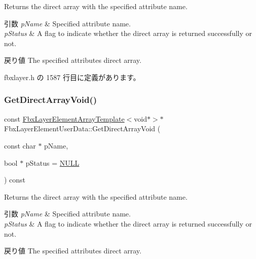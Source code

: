 Returns the direct array with the specified attribute name. 
\begin{DoxyParams}{引数}
{\em p\+Name} & Specified attribute name. \\
\hline
{\em p\+Status} & A flag to indicate whether the direct array is returned successfully or not. \\
\hline
\end{DoxyParams}
\begin{DoxyReturn}{戻り値}
The specified attribute\textquotesingle{}s direct array. 
\end{DoxyReturn}


 fbxlayer.\+h の 1587 行目に定義があります。

\mbox{\label{class_fbx_layer_element_user_data_a3dc62d940655a5afbf1e8893dba620a3}} 
\subsubsection{\texorpdfstring{Get\+Direct\+Array\+Void()}{GetDirectArrayVoid()}\hspace{0.1cm}{\footnotesize\ttfamily [4/4]}}
{\footnotesize\ttfamily const \hyperlink{class_fbx_layer_element_array_template}{Fbx\+Layer\+Element\+Array\+Template}$<$void$\ast$$>$$\ast$ Fbx\+Layer\+Element\+User\+Data\+::\+Get\+Direct\+Array\+Void (\begin{DoxyParamCaption}\item[{const char $\ast$}]{p\+Name,  }\item[{bool $\ast$}]{p\+Status = {\ttfamily \hyperlink{fbxarch_8h_a070d2ce7b6bb7e5c05602aa8c308d0c4}{N\+U\+LL}} }\end{DoxyParamCaption}) const\hspace{0.3cm}{\ttfamily [inline]}}

Returns the direct array with the specified attribute name. 
\begin{DoxyParams}{引数}
{\em p\+Name} & Specified attribute name. \\
\hline
{\em p\+Status} & A flag to indicate whether the direct array is returned successfully or not. \\
\hline
\end{DoxyParams}
\begin{DoxyReturn}{戻り値}
The specified attribute\textquotesingle{}s direct array. 
\end{DoxyReturn}


